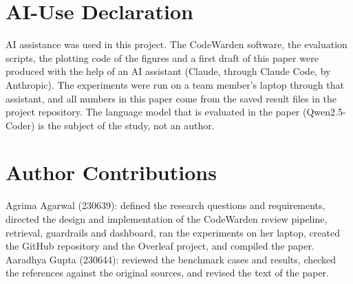 \documentclass[12pt,onecolumn,draftclsnofoot]{IEEEtran}
\begin{document}
\section*{AI-Use Declaration}
AI assistance was used in this project. The CodeWarden software, the evaluation scripts, the plotting code of the figures and a first draft of this paper were produced with the help of an AI assistant (Claude, through Claude Code, by Anthropic). The experiments were run on a team member's laptop through that assistant, and all numbers in this paper come from the saved result files in the project repository. The language model that is evaluated in the paper (Qwen2.5-Coder) is the subject of the study, not an author.

\section*{Author Contributions}
Agrima Agarwal (230639): defined the research questions and requirements, directed the design and implementation of the CodeWarden review pipeline, retrieval, guardrails and dashboard, ran the experiments on her laptop, created the GitHub repository and the Overleaf project, and compiled the paper.\\
Aaradhya Gupta (230644): reviewed the benchmark cases and results, checked the references against the original sources, and revised the text of the paper. %



\end{document}
